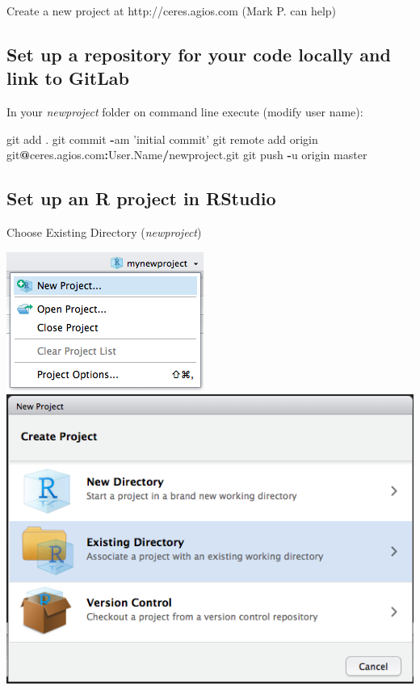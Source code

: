 \documentclass[openany]{book}
\newenvironment{Shaded}{\begin{snugshade}}{\end{snugshade}}
\newcommand{\NormalTok}[1]{#1}
\newcommand{\OperatorTok}[1]{\textcolor[rgb]{0.81,0.36,0.00}{\textbf{#1}}}
\newcommand{\StringTok}[1]{\textcolor[rgb]{0.31,0.60,0.02}{#1}}
\begin{document}
Create a new project at http://ceres.agios.com (Mark P. can help)

\hypertarget{set-up-a-repository-for-your-code-locally-and-link-to-gitlab}{%
\subsection{Set up a repository for your code locally and link to GitLab}\label{set-up-a-repository-for-your-code-locally-and-link-to-gitlab}}

In your \emph{newproject} folder on command line execute (modify user name):

\begin{Shaded}
\begin{Highlighting}[]
\NormalTok{git add .}
\NormalTok{git commit }\OperatorTok{-}\NormalTok{am }\StringTok{'initial commit'}
\NormalTok{git remote add origin git}\OperatorTok{@}\NormalTok{ceres.agios.com}\OperatorTok{:}\NormalTok{User.Name}\OperatorTok{/}\NormalTok{newproject.git}
\NormalTok{git push }\OperatorTok{-}\NormalTok{u origin master }
\end{Highlighting}
\end{Shaded}

\hypertarget{set-up-an-r-project-in-rstudio}{%
\subsection{Set up an R project in RStudio}\label{set-up-an-r-project-in-rstudio}}

Choose Existing Directory (\emph{newproject})

\includegraphics[width=0.6\linewidth]{images/newproject0}
\includegraphics[width=0.6\linewidth]{images/newproject}
\end{document}
